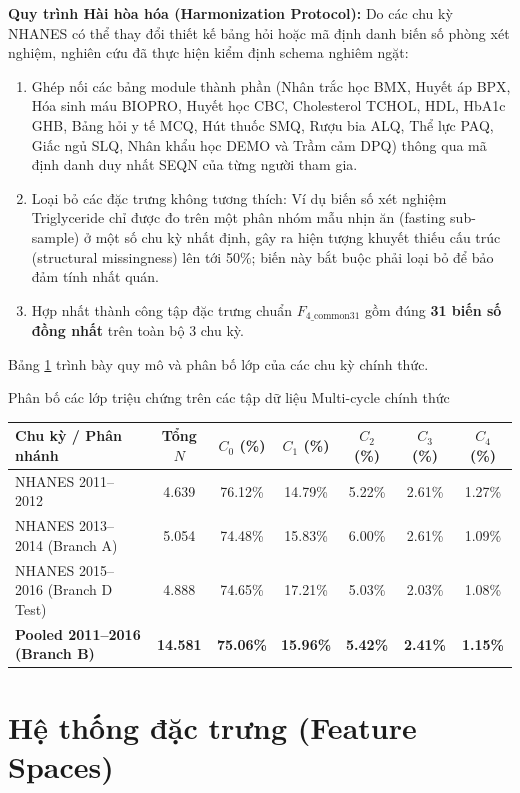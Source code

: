 \textbf{Quy trình Hài hòa hóa (Harmonization Protocol):}
Do các chu kỳ NHANES có thể thay đổi thiết kế bảng hỏi hoặc mã định danh biến số phòng xét nghiệm, nghiên cứu đã thực hiện kiểm định schema nghiêm ngặt:
\begin{enumerate}
    \item Ghép nối các bảng module thành phần (Nhân trắc học BMX, Huyết áp BPX, Hóa sinh máu BIOPRO, Huyết học CBC, Cholesterol TCHOL, HDL, HbA1c GHB, Bảng hỏi y tế MCQ, Hút thuốc SMQ, Rượu bia ALQ, Thể lực PAQ, Giấc ngủ SLQ, Nhân khẩu học DEMO và Trầm cảm DPQ) thông qua mã định danh duy nhất SEQN của từng người tham gia.
    \item Loại bỏ các đặc trưng không tương thích: Ví dụ biến số xét nghiệm Triglyceride chỉ được đo trên một phân nhóm mẫu nhịn ăn (fasting sub-sample) ở một số chu kỳ nhất định, gây ra hiện tượng khuyết thiếu cấu trúc (structural missingness) lên tới 50\%; biến này bắt buộc phải loại bỏ để bảo đảm tính nhất quán.
    \item Hợp nhất thành công tập đặc trưng chuẩn $F_{4\_\text{common31}}$ gồm đúng \textbf{31 biến số đồng nhất} trên toàn bộ 3 chu kỳ.
\end{enumerate}

Bảng \ref{tab:multicycle-class-dist} trình bày quy mô và phân bố lớp của các chu kỳ chính thức.

\begin{table}{Phân bố các lớp triệu chứng trên các tập dữ liệu Multi-cycle chính thức}
\centering
\label{tab:multicycle-class-dist}
\begin{tabular}{l c c c c c c}
\toprule
\textbf{Chu kỳ / Phân nhánh} & \textbf{Tổng $N$} & \textbf{$C_0$ (\%)} & \textbf{$C_1$ (\%)} & \textbf{$C_2$ (\%)} & \textbf{$C_3$ (\%)} & \textbf{$C_4$ (\%)} \\
\midrule
NHANES 2011--2012 & 4.639 & 76.12\% & 14.79\% & 5.22\% & 2.61\% & 1.27\% \\
NHANES 2013--2014 (Branch A) & 5.054 & 74.48\% & 15.83\% & 6.00\% & 2.61\% & 1.09\% \\
NHANES 2015--2016 (Branch D Test) & 4.888 & 74.65\% & 17.21\% & 5.03\% & 2.03\% & 1.08\% \\
\midrule
\textbf{Pooled 2011--2016 (Branch B)} & \textbf{14.581} & \textbf{75.06\%} & \textbf{15.96\%} & \textbf{5.42\%} & \textbf{2.41\%} & \textbf{1.15\%} \\
\bottomrule
\end{tabular}
\end{table}

\section{Hệ thống đặc trưng (Feature Spaces)}
\label{sec:he-thong-dac-trung}

